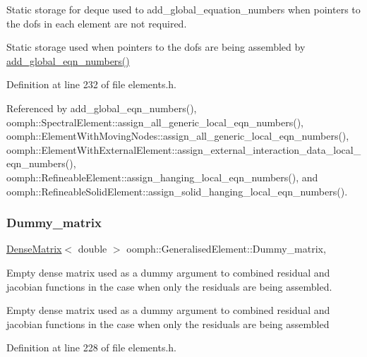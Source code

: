 Static storage for deque used to add\+\_\+global\+\_\+equation\+\_\+numbers when pointers to the dofs in each element are not required. 

Static storage used when pointers to the dofs are being assembled by \hyperlink{classoomph_1_1GeneralisedElement_a540a363b1ea07065dd2ed1b223d0e4c4}{add\+\_\+global\+\_\+eqn\+\_\+numbers()} 

Definition at line 232 of file elements.\+h.



Referenced by add\+\_\+global\+\_\+eqn\+\_\+numbers(), oomph\+::\+Spectral\+Element\+::assign\+\_\+all\+\_\+generic\+\_\+local\+\_\+eqn\+\_\+numbers(), oomph\+::\+Element\+With\+Moving\+Nodes\+::assign\+\_\+all\+\_\+generic\+\_\+local\+\_\+eqn\+\_\+numbers(), oomph\+::\+Element\+With\+External\+Element\+::assign\+\_\+external\+\_\+interaction\+\_\+data\+\_\+local\+\_\+eqn\+\_\+numbers(), oomph\+::\+Refineable\+Element\+::assign\+\_\+hanging\+\_\+local\+\_\+eqn\+\_\+numbers(), and oomph\+::\+Refineable\+Solid\+Element\+::assign\+\_\+solid\+\_\+hanging\+\_\+local\+\_\+eqn\+\_\+numbers().

\mbox{\label{classoomph_1_1GeneralisedElement_a4bff11b8ff97aefabb2df41e61e1779f}} 
\subsubsection{\texorpdfstring{Dummy\+\_\+matrix}{Dummy\_matrix}}
{\footnotesize\ttfamily \hyperlink{classoomph_1_1DenseMatrix}{Dense\+Matrix}$<$ double $>$ oomph\+::\+Generalised\+Element\+::\+Dummy\+\_\+matrix\hspace{0.3cm}{\ttfamily [static]}, {\ttfamily [protected]}}



Empty dense matrix used as a dummy argument to combined residual and jacobian functions in the case when only the residuals are being assembled. 

Empty dense matrix used as a dummy argument to combined residual and jacobian functions in the case when only the residuals are being assembled 

Definition at line 228 of file elements.\+h.




